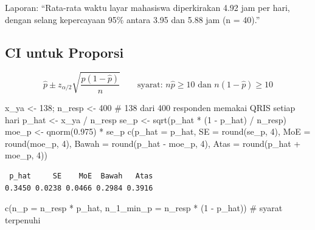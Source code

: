\documentclass[
  indonesian,
  letterpaper,
]{book}
\newenvironment{Shaded}{\begin{snugshade}}{\end{snugshade}}
\newcommand{\AttributeTok}[1]{\textcolor[rgb]{0.40,0.45,0.13}{#1}}
\newcommand{\CommentTok}[1]{\textcolor[rgb]{0.37,0.37,0.37}{#1}}
\newcommand{\DecValTok}[1]{\textcolor[rgb]{0.68,0.00,0.00}{#1}}
\newcommand{\FloatTok}[1]{\textcolor[rgb]{0.68,0.00,0.00}{#1}}
\newcommand{\FunctionTok}[1]{\textcolor[rgb]{0.28,0.35,0.67}{#1}}
\newcommand{\NormalTok}[1]{\textcolor[rgb]{0.00,0.23,0.31}{#1}}
\newcommand{\OtherTok}[1]{\textcolor[rgb]{0.00,0.23,0.31}{#1}}
\newcommand{\SpecialCharTok}[1]{\textcolor[rgb]{0.37,0.37,0.37}{#1}}
\begin{document}
Laporan: ``Rata-rata waktu layar mahasiswa diperkirakan 4.92 jam per
hari, dengan selang kepercayaan 95\% antara 3.95 dan 5.88 jam (n =
40).''

\subsection{CI untuk Proporsi}\label{ci-untuk-proporsi}

\[\widehat{p} \pm z_{\alpha/2}\sqrt{\frac{\widehat{p}(1 - \widehat{p})}{n}} \qquad \text{syarat: } n\widehat{p} \ge 10 \text{ dan } n(1 - \widehat{p}) \ge 10\]

\begin{Shaded}
\begin{Highlighting}[]
\NormalTok{x\_ya }\OtherTok{\textless{}{-}} \DecValTok{138}\NormalTok{; n\_resp }\OtherTok{\textless{}{-}} \DecValTok{400} \CommentTok{\# 138 dari 400 responden memakai QRIS setiap hari}
\NormalTok{p\_hat }\OtherTok{\textless{}{-}}\NormalTok{ x\_ya }\SpecialCharTok{/}\NormalTok{ n\_resp}
\NormalTok{se\_p }\OtherTok{\textless{}{-}} \FunctionTok{sqrt}\NormalTok{(p\_hat }\SpecialCharTok{*}\NormalTok{ (}\DecValTok{1} \SpecialCharTok{{-}}\NormalTok{ p\_hat) }\SpecialCharTok{/}\NormalTok{ n\_resp)}
\NormalTok{moe\_p }\OtherTok{\textless{}{-}} \FunctionTok{qnorm}\NormalTok{(}\FloatTok{0.975}\NormalTok{) }\SpecialCharTok{*}\NormalTok{ se\_p}
\FunctionTok{c}\NormalTok{(}\AttributeTok{p\_hat =}\NormalTok{ p\_hat, }\AttributeTok{SE =} \FunctionTok{round}\NormalTok{(se\_p, }\DecValTok{4}\NormalTok{), }\AttributeTok{MoE =} \FunctionTok{round}\NormalTok{(moe\_p, }\DecValTok{4}\NormalTok{),}
\AttributeTok{Bawah =} \FunctionTok{round}\NormalTok{(p\_hat }\SpecialCharTok{{-}}\NormalTok{ moe\_p, }\DecValTok{4}\NormalTok{), }\AttributeTok{Atas =} \FunctionTok{round}\NormalTok{(p\_hat }\SpecialCharTok{+}\NormalTok{ moe\_p, }\DecValTok{4}\NormalTok{))}
\end{Highlighting}
\end{Shaded}

\begin{verbatim}
 p_hat     SE    MoE  Bawah   Atas 
0.3450 0.0238 0.0466 0.2984 0.3916 
\end{verbatim}

\begin{Shaded}
\begin{Highlighting}[]
\FunctionTok{c}\NormalTok{(}\AttributeTok{n\_p =}\NormalTok{ n\_resp }\SpecialCharTok{*}\NormalTok{ p\_hat, }\AttributeTok{n\_1\_min\_p =}\NormalTok{ n\_resp }\SpecialCharTok{*}\NormalTok{ (}\DecValTok{1} \SpecialCharTok{{-}}\NormalTok{ p\_hat)) }\CommentTok{\# syarat terpenuhi}
\end{Highlighting}
\end{Shaded}
\end{document}
